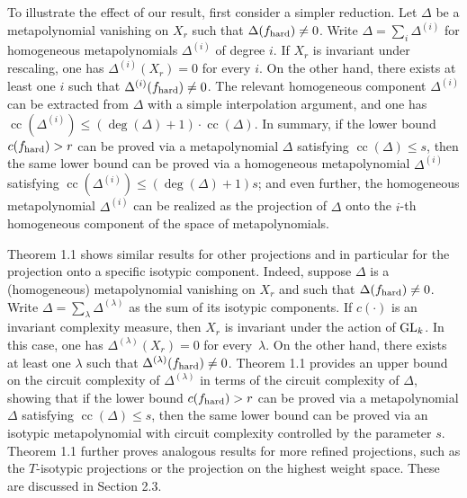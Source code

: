 \documentclass[10pt,a4paper]{article}
\begin{document}
To illustrate the effect of our result, first consider a simpler reduction. Let $\Delta$ be a metapolynomial vanishing on $X_{r}$ such that $\Delta(f_{\textup{hard}})\neq 0$. Write $\Delta=\sum_{i}\Delta^{(i)}$ for homogeneous metapolynomials $\Delta^{(i)}$ of degree $i$. If $X_{r}$ is invariant under rescaling, one has $\Delta^{(i)}(X_{r})=0$ for every $i$. On the other hand, there exists at least one $i$ such that $\Delta^{(i)}(f_{\textup{hard}})\neq 0$. The relevant homogeneous component $\Delta^{(i)}$ can be extracted from $\Delta$ with a simple interpolation argument, and one has $\operatorname{cc}(\Delta^{(i)})\leq(\deg(\Delta)+1)\cdot\operatorname{cc}(\Delta)$. In summary, if the lower bound $c(f_{\textup{hard}})>r$ can be proved via a metapolynomial $\Delta$ satisfying $\operatorname{cc}(\Delta)\leq s$, then the same lower bound can be proved via a homogeneous metapolynomial $\Delta^{(i)}$ satisfying $\operatorname{cc}(\Delta^{(i)})\leq(\deg(\Delta)+1)s$; and even further, the homogeneous metapolynomial $\Delta^{(i)}$ can be realized as the projection of $\Delta$ onto the $i$-th homogeneous component of the space of metapolynomials.





Theorem 1.1 shows similar results for other projections and in particular for the projection onto a specific isotypic component. Indeed, suppose $\Delta$ is a (homogeneous) metapolynomial vanishing on $X_{r}$ and such that $\Delta(f_{\textup{hard}})\neq 0$. Write $\Delta=\sum_{\lambda}\Delta^{(\lambda)}$ as the sum of its isotypic components. If $c(\cdot)$ is an invariant complexity measure, then $X_{r}$ is invariant under the action of $\textnormal{GL}_{k}$. In this case, one has $\Delta^{(\lambda)}(X_{r})=0$ for every $\lambda$. On the other hand, there exists at least one $\lambda$ such that $\Delta^{(\lambda)}(f_{\textup{hard}})\neq 0$. Theorem 1.1 provides an upper bound on the circuit complexity of $\Delta^{(\lambda)}$ in terms of the circuit complexity of $\Delta$, showing that if the lower bound $c(f_{\textup{hard}})>r$ can be proved via a metapolynomial $\Delta$ satisfying $\operatorname{cc}(\Delta)\leq s$, then the same lower bound can be proved via an isotypic metapolynomial with circuit complexity controlled by the parameter $s$. Theorem 1.1 further proves analogous results for more refined projections, such as the $T$-isotypic projections or the projection on the highest weight space. These are discussed in Section 2.3.
\end{document}
